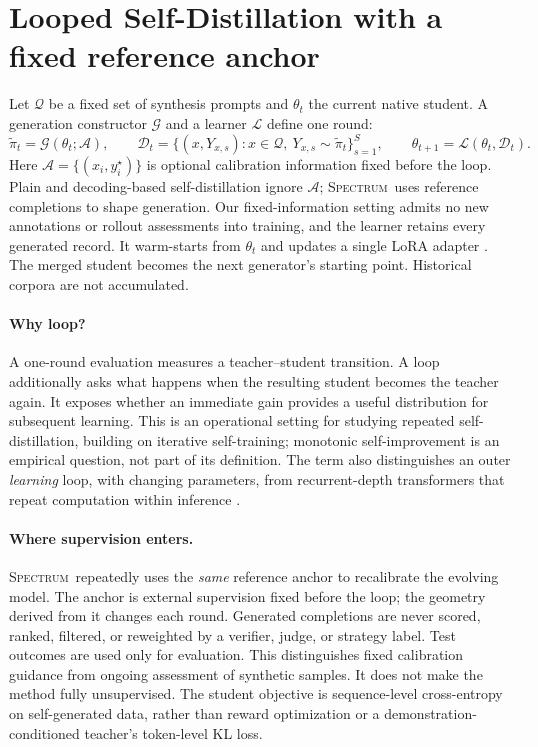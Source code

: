 \documentclass{article}
\newcommand{\method}{\textsc{Spectrum}}
\newcommand{\cA}{\mathcal A}
\newcommand{\cD}{\mathcal D}
\newcommand{\cQ}{\mathcal Q}
\begin{document}
\section{Looped Self-Distillation with a fixed reference anchor}
\label{sec:loop}
Let $\cQ$ be a fixed set of synthesis prompts and $\theta_t$ the current native student. A generation constructor $\mathcal G$ and a learner $\mathcal L$ define one round:
\begin{equation}
\widetilde\pi_t=\mathcal G(\theta_t;\cA),\qquad
\cD_t=\{(x,Y_{x,s}):x\in\cQ,\ Y_{x,s}\sim\widetilde\pi_t\}_{s=1}^{S},\qquad
\theta_{t+1}=\mathcal L(\theta_t,\cD_t).
\label{eq:loop}
\end{equation}
Here $\cA=\{(x_i,y_i^\star)\}$ is optional calibration information fixed before the loop. Plain and decoding-based self-distillation ignore $\cA$; \method\ uses reference completions to shape generation. Our fixed-information setting admits no new annotations or rollout assessments into training, and the learner retains every generated record. It warm-starts from $\theta_t$ and updates a single LoRA adapter \citep{hu2022lora}. The merged student becomes the next generator's starting point. Historical corpora are not accumulated.

\paragraph{Why loop?}
A one-round evaluation measures a teacher--student transition. A loop additionally asks what happens when the resulting student becomes the teacher again. It exposes whether an immediate gain provides a useful distribution for subsequent learning. This is an operational setting for studying repeated self-distillation, building on iterative self-training; monotonic self-improvement is an empirical question, not part of its definition. The term also distinguishes an outer \emph{learning} loop, with changing parameters, from recurrent-depth transformers that repeat computation within inference \citep{dehghani2019universal}.

\paragraph{Where supervision enters.}
\method\ repeatedly uses the \emph{same} reference anchor to recalibrate the evolving model. The anchor is external supervision fixed before the loop; the geometry derived from it changes each round. Generated completions are never scored, ranked, filtered, or reweighted by a verifier, judge, or strategy label. Test outcomes are used only for evaluation. This distinguishes fixed calibration guidance from ongoing assessment of synthetic samples. It does not make the method fully unsupervised. The student objective is sequence-level cross-entropy on self-generated data, rather than reward optimization or a demonstration-conditioned teacher's token-level KL loss.
\end{document}
